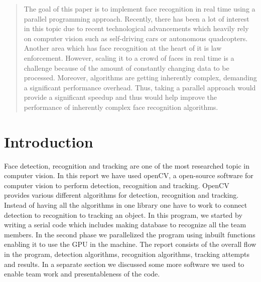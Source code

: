\documentclass[conference]{IEEEtran}
\begin{document}




\maketitle

\begin{abstract}
The goal of this paper is to implement face recognition in real time using a parallel programming approach. Recently, there has been a lot of interest in this topic due to recent technological advancements which heavily rely on computer vision such as self-driving cars or autonomous quadcopters. Another area which has face recognition at the heart of it is law enforcement. However, scaling it to a crowd of faces in real time is a challenge because of the amount of constantly changing data to be processed. Moreover, algorithms are getting inherently complex, demanding a significant performance overhead. Thus, taking a parallel approach would provide a significant speedup and thus would help improve the performance of inherently complex face recognition algorithms.
\end{abstract}





%
\IEEEpeerreviewmaketitle



\section{Introduction}
Face detection, recognition and tracking are one of the most researched topic in computer vision. In this report we have used openCV, a open-source software for computer vision to perform detection, recognition and tracking. OpenCV provides various different algorithms for detection, recognition and tracking. Instead of having all the algorithms in one library one have to work to connect detection to recognition to tracking an object. In this program, we started by writing a serial code which includes making database to recognize all the team members. In the second phase we parallelized the program using inbuilt functions enabling it to use the GPU in the machine. The report consists of the overall flow in the program, detection algorithms, recognition algorithms, tracking attempts and results. In a separate section we discussed some more software we used to enable team work and presentableness of the code.
\end{document}
